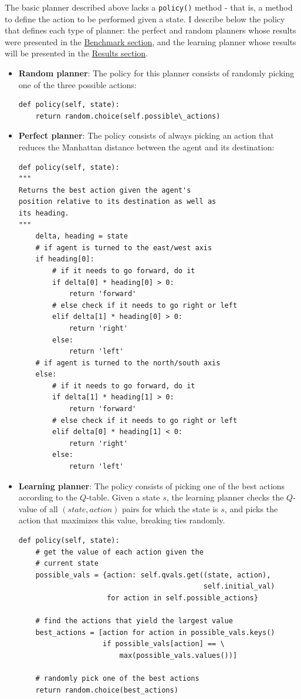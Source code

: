 \documentclass{article}
\begin{document}
The basic planner described above lacks a \texttt{policy()} method - that is, a method to define the action to be performed given a state. I describe below the policy that defines each type of planner: the perfect and random planners whose results were presented in the \hyperref[sec:benchmark]{Benchmark section}, and the learning planner whose results will be presented in the \hyperref[sec:results]{Results section}.

\begin{itemize}
    \item \textbf{Random planner}: The policy for this planner consists of randomly picking one of the three possible actions:
    \begin{verbatim}
def policy(self, state):
    return random.choice(self.possible\_actions)\end{verbatim}
    \item \textbf{Perfect planner}: The policy consists of always picking an action that reduces the Manhattan distance between the agent and its destination:
\newpage
    \begin{verbatim}
def policy(self, state):
"""
Returns the best action given the agent's
position relative to its destination as well as
its heading.
"""
    delta, heading = state
    # if agent is turned to the east/west axis
    if heading[0]:
        # if it needs to go forward, do it
        if delta[0] * heading[0] > 0:
            return 'forward'
        # else check if it needs to go right or left
        elif delta[1] * heading[0] > 0:
            return 'right'
        else:
            return 'left'
    # if agent is turned to the north/south axis
    else:
        # if it needs to go forward, do it
        if delta[1] * heading[1] > 0:
            return 'forward'
        # else check if it needs to go right or left
        elif delta[0] * heading[1] < 0:
            return 'right'
        else:
            return 'left'\end{verbatim}
    \item \textbf{Learning planner}: The policy consists of picking one of the best actions according to the $Q$-table. Given a state $s$, the learning planner checks the $Q$-value of all $(state, action)$ pairs for which the state is $s$, and picks the action that maximizes this value, breaking ties randomly.
    \begin{verbatim}
def policy(self, state):
    # get the value of each action given the
    # current state
    possible_vals = {action: self.qvals.get((state, action), 
                                            self.initial_val)
                     for action in self.possible_actions}
    
    # find the actions that yield the largest value
    best_actions = [action for action in possible_vals.keys()
                    if possible_vals[action] == \
                        max(possible_vals.values())]
    
    # randomly pick one of the best actions
    return random.choice(best_actions)\end{verbatim}
\end{itemize}
\end{document}
